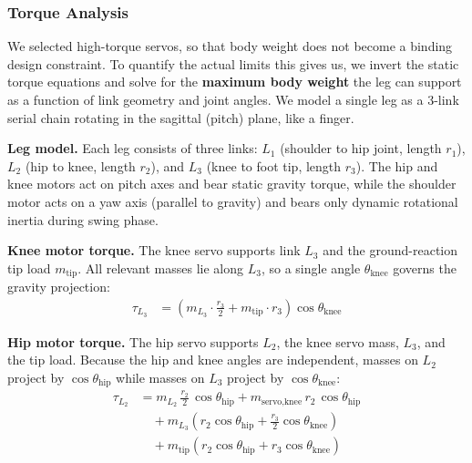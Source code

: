 
\subsubsection{Torque Analysis}

We selected high-torque servos, so that body weight does not become a binding design constraint.
To quantify the actual limits this gives us, we invert the static torque equations and solve for the \textbf{maximum body weight} the leg can support as a function of link geometry and joint angles.
We model a single leg as a 3-link serial chain rotating in the sagittal (pitch) plane, like a finger.


\vspace{0.5cm}
\textbf{Leg model.}
Each leg consists of three links: $L_1$ (shoulder to hip joint, length $r_1$), $L_2$ (hip to knee, length $r_2$), and $L_3$ (knee to foot tip, length $r_3$).
The hip and knee motors act on pitch axes and bear static gravity torque, while the shoulder motor acts on a yaw axis (parallel to gravity) and bears only dynamic rotational inertia during swing phase.

\vspace{0.5cm}
\textbf{Knee motor torque.}
The knee servo supports link $L_3$ and the ground-reaction tip load $m_{\text{tip}}$.
All relevant masses lie along $L_3$, so a single angle $\theta_{\text{knee}}$ governs the gravity projection:
%
\begin{align*}
  \tau_{L_3}
  &= \left( m_{L_3} \cdot \frac{r_3}{2}
  + m_{\text{tip}} \cdot r_3 \right)
  \cos\theta_{\text{knee}}
\end{align*}

\textbf{Hip motor torque.}
The hip servo supports $L_2$, the knee servo mass, $L_3$, and the tip load.
Because the hip and knee angles are independent, masses on $L_2$ project by
$\cos\theta_{\text{hip}}$ while masses on $L_3$ project by
$\cos\theta_{\text{knee}}$:
%
\begin{align*}
  \tau_{L_2}
  &= m_{L_2}\,\frac{r_2}{2}\,\cos\theta_{\text{hip}}
  + m_{\text{servo,knee}}\,r_2\,\cos\theta_{\text{hip}} \\
  &\quad + m_{L_3}\!\left(r_2\cos\theta_{\text{hip}}
  + \frac{r_3}{2}\cos\theta_{\text{knee}}\right) \\
  &\quad + m_{\text{tip}}\!\left(r_2\cos\theta_{\text{hip}}
  + r_3\cos\theta_{\text{knee}}\right)
\end{align*}

